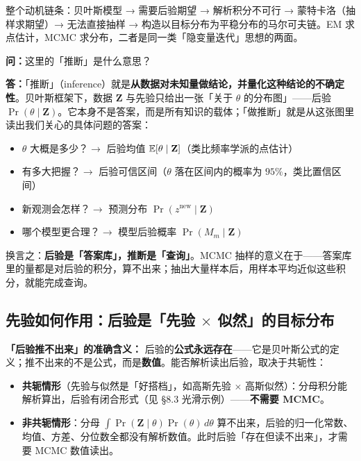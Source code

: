 \begin{remark}
    整个动机链条：贝叶斯模型 → 需要后验期望 → 解析积分不可行 → 蒙特卡洛（抽样求期望）→ 无法直接抽样 → 构造以目标分布为平稳分布的马尔可夫链。EM 求点估计，MCMC 求分布，二者是同一类「隐变量迭代」思想的两面。
\end{remark}

\begin{qa}
    \textbf{问：}这里的「推断」是什么意思？

    \textbf{答：}「推断」（inference）就是\textbf{从数据对未知量做结论，并量化这种结论的不确定性}。贝叶斯框架下，数据 $\mathbf{Z}$ 与先验只给出一张「关于 $\theta$ 的分布图」——后验 $\Pr(\theta\mid\mathbf{Z})$。它本身不是答案，而是所有知识的载体；「做推断」就是从这张图里读出我们关心的具体问题的答案：

    \begin{itemize}
        \item $\theta$ 大概是多少？$\rightarrow$ 后验均值 $\mathbb{E}[\theta\mid\mathbf{Z}]$（类比频率学派的点估计）
        \item 有多大把握？$\rightarrow$ 后验可信区间（$\theta$ 落在区间内的概率为 $95\%$，类比置信区间）
        \item 新观测会怎样？$\rightarrow$ 预测分布 $\Pr(z^{\text{new}}\mid\mathbf{Z})$
        \item 哪个模型更合理？$\rightarrow$ 模型后验概率 $\Pr(M_m\mid\mathbf{Z})$
    \end{itemize}

    换言之：\textbf{后验是「答案库」，推断是「查询」}。MCMC 抽样的意义在于——答案库里的量都是对后验的积分，算不出来；抽出大量样本后，用样本平均近似这些积分，就能完成查询。
\end{qa}

\subsection{先验如何作用：后验是「先验 $\times$ 似然」的目标分布}

\textbf{「后验推不出来」的准确含义：} 后验的\textbf{公式永远存在}——它是贝叶斯公式的定义；推不出来的不是公式，而是\textbf{数值}。能否解析读出后验，取决于共轭性：

\begin{itemize}
    \item \textbf{共轭情形}（先验与似然是「好搭档」，如高斯先验 $\times$ 高斯似然）：分母积分能解析算出，后验有闭合形式（见 §8.3 光滑示例）——\textbf{不需要 MCMC}。
    \item \textbf{非共轭情形}：分母 $\int \Pr(\mathbf{Z}\mid\theta)\Pr(\theta)\,d\theta$ 算不出来，后验的归一化常数、均值、方差、分位数全都没有解析数值。此时后验「存在但读不出来」，才需要 MCMC 数值读出。
\end{itemize}

